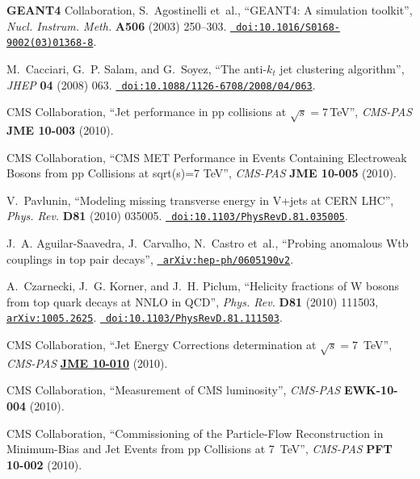 \begin{thebibliography}{10}
{\bf GEANT4} Collaboration, S.~Agostinelli {et~al.}, ``{GEANT4: A simulation
  toolkit}'', {\em Nucl. Instrum. Meth.} {\bf A506} (2003)
250--303.
  \href{http://dx.doi.org/10.1016/S0168-9002(03)01368-8}{{\tt
  doi:10.1016/S0168-9002(03)01368-8}}.

M.~Cacciari, G.~P. Salam, and G.~Soyez, ``{The anti-{$k_t$} jet clustering
  algorithm}'', {\em JHEP} {\bf 04} (2008)
063.
  \href{http://dx.doi.org/10.1088/1126-6708/2008/04/063}{{\tt
  doi:10.1088/1126-6708/2008/04/063}}.

{CMS Collaboration}, ``Jet performance in pp collisions at $\sqrt{s} =
  7$\,TeV'', {\em CMS-PAS} {\bf JME 10-003} (2010).

{CMS Collaboration}, ``CMS MET Performance in Events Containing Electroweak
  Bosons from pp Collisions at sqrt(s)=7 TeV'', {\em CMS-PAS} {\bf JME 10-005}
  (2010).

V.~Pavlunin, ``{Modeling missing transverse energy in V+jets at CERN LHC}'',
  {\em Phys. Rev.} {\bf D81} (2010)
035005.
  \href{http://dx.doi.org/10.1103/PhysRevD.81.035005}{{\tt
  doi:10.1103/PhysRevD.81.035005}}.

J.~A. Aguilar-Saavedra, J.~Carvalho, N.~Castro{ et~al.}, ``Probing anomalous
  Wtb couplings in top pair decays'',
  \href{http://www.arXiv.org/abs/hep-ph/0605190v2}{{\tt
  arXiv:hep-ph/0605190v2}}.

A.~Czarnecki, J.~G. Korner, and J.~H. Piclum, ``{Helicity fractions of W bosons
  from top quark decays at NNLO in QCD}'', {\em Phys. Rev.} {\bf D81} (2010)
  111503,
\href{http://www.arXiv.org/abs/1005.2625}{{\tt arXiv:1005.2625}}.
  \href{http://dx.doi.org/10.1103/PhysRevD.81.111503}{{\tt
  doi:10.1103/PhysRevD.81.111503}}.

{CMS Collaboration}, ``Jet Energy Corrections determination at
  {$\sqrt{s}=7$}~TeV'', {\em CMS-PAS} {\bf
  \href{http://cdsweb.cern.ch/record/1308178}{JME 10-010}} (2010).

{CMS Collaboration}, ``Measurement of CMS luminosity'', {\em CMS-PAS} {\bf
  EWK-10-004} (2010).

{CMS Collaboration}, ``Commissioning of the Particle-Flow Reconstruction in
  Minimum-Bias and Jet Events from pp Collisions at 7~TeV'', {\em CMS-PAS} {\bf
  PFT 10-002} (2010).


\end{thebibliography}
